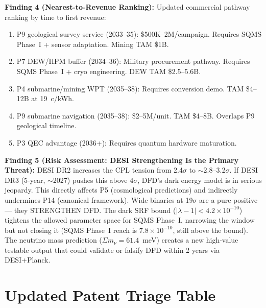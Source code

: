 \documentclass[11pt]{article}
\newcommand{\ee}[1]{\times 10^{#1}}
\newcommand{\lambdaone}{|\lambda{-}1|}
\begin{document}
\begin{tcolorbox}[colback=blue!5!white, colframe=blue!60!black,
  title=\textbf{W4i11: Five Key Findings}]
\textbf{Finding 4 (Nearest-to-Revenue Ranking):}
Updated commercial pathway ranking by time to first revenue:
\begin{enumerate}[nosep]
  \item P9 geological survey service (2033--35): \$500K--2M/campaign.
    Requires SQMS Phase~I + sensor adaptation. Mining TAM \$1B.
  \item P7 DEW/HPM buffer (2034--36): Military procurement pathway.
    Requires SQMS Phase~I + cryo engineering. DEW TAM \$2.5--5.6B.
  \item P4 submarine/mining WPT (2035--38): Requires conversion demo.
    TAM \$4--12B at 19~c/kWh.
  \item P9 submarine navigation (2035--38): \$2--5M/unit.
    TAM \$4--8B. Overlaps P9 geological timeline.
  \item P3 QEC advantage (2036+): Requires quantum hardware maturation.
\end{enumerate}

\textbf{Finding 5 (Risk Assessment: DESI Strengthening Is the Primary
  Threat):}
DESI DR2 increases the CPL tension from 2.4$\sigma$ to $\sim$2.8--3.2$\sigma$.
If DESI DR3 (5-year, $\sim$2027) pushes this above 4$\sigma$, DFD's
dark energy model is in serious jeopardy. This directly affects P5
(cosmological predictions) and indirectly undermines P14 (canonical
framework). Wide binaries at 19$\sigma$ are a pure positive ---
they STRENGTHEN DFD. The dark SRF bound ($\lambdaone < 4.2\ee{-10}$)
tightens the allowed parameter space for SQMS Phase~I, narrowing
the window but not closing it (SQMS Phase~I reach is $7.8\ee{-10}$,
still above the bound). The neutrino mass prediction ($\Sigma m_\nu
= 61.4$~meV) creates a new high-value testable output that could
validate or falsify DFD within 2 years via DESI+Planck.

\end{tcolorbox}

\part{Updated Patent Triage Table}
\label{part:triage}

\end{document}
